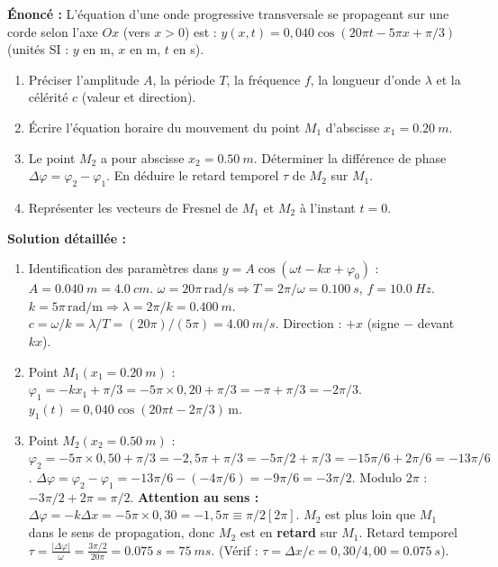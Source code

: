 \documentclass[11pt]{article}
\begin{document}
\begin{exoresolu}
\textbf{Énoncé :} L'équation d'une onde progressive transversale se propageant sur une corde selon l'axe $Ox$ (vers $x>0$) est :
$y(x,t) = 0,040 \cos(20\pi t - 5\pi x + \pi/3)$ (unités SI : $y$ en m, $x$ en m, $t$ en s).
\begin{enumerate}
    \item Préciser l'amplitude $A$, la période $T$, la fréquence $f$, la longueur d'onde $\lambda$ et la célérité $c$ (valeur et direction).
    \item Écrire l'équation horaire du mouvement du point $M_1$ d'abscisse $x_1 = \SI{0,20}{m}$.
    \item Le point $M_2$ a pour abscisse $x_2 = \SI{0,50}{m}$. Déterminer la différence de phase $\Delta \varphi = \varphi_2 - \varphi_1$. En déduire le retard temporel $\tau$ de $M_2$ sur $M_1$.
    \item Représenter les vecteurs de Fresnel de $M_1$ et $M_2$ à l'instant $t=0$.
\end{enumerate}
\tcblower
\textbf{Solution détaillée :}
\begin{enumerate}
    \item Identification des paramètres dans $y = A \cos(\omega t - k x + \varphi_0)$ :
    $A = \SI{0,040}{m} = \SI{4,0}{cm}$.
    $\omega = 20\pi\,\text{rad/s} \Rightarrow T = 2\pi/\omega = \SI{0,100}{s}$, $f = \SI{10,0}{Hz}$.
    $k = 5\pi\,\text{rad/m} \Rightarrow \lambda = 2\pi/k = \SI{0,400}{m}$.
    $c = \omega/k = \lambda/T = (20\pi)/(5\pi) = \SI{4,00}{m/s}$. Direction : $+x$ (signe $-$ devant $kx$).
    \item Point $M_1(x_1=\SI{0,20}{m})$ :
    $\varphi_1 = -k x_1 + \pi/3 = -5\pi \times 0,20 + \pi/3 = -\pi + \pi/3 = -2\pi/3$.
    $y_1(t) = 0,040 \cos(20\pi t - 2\pi/3)\,\text{m}$.
    \item Point $M_2(x_2=\SI{0,50}{m})$ :
    $\varphi_2 = -5\pi \times 0,50 + \pi/3 = -2,5\pi + \pi/3 = -5\pi/2 + \pi/3 = -15\pi/6 + 2\pi/6 = -13\pi/6$.
    $\Delta \varphi = \varphi_2 - \varphi_1 = -13\pi/6 - (-4\pi/6) = -9\pi/6 = -3\pi/2$.
    Modulo $2\pi$ : $-3\pi/2 + 2\pi = \pi/2$.
    \textbf{Attention au sens :} $\Delta \varphi = -k\Delta x = -5\pi \times 0,30 = -1,5\pi \equiv \pi/2 [2\pi]$.
    $M_2$ est plus loin que $M_1$ dans le sens de propagation, donc $M_2$ est en \textbf{retard} sur $M_1$.
    Retard temporel $\tau = \frac{|\Delta \varphi|}{\omega} = \frac{3\pi/2}{20\pi} = \SI{0,075}{s} = \SI{75}{ms}$.
    (Vérif : $\tau = \Delta x / c = 0,30 / 4,00 = \SI{0,075}{s}$).

\end{enumerate}
\end{exoresolu}
\end{document}
